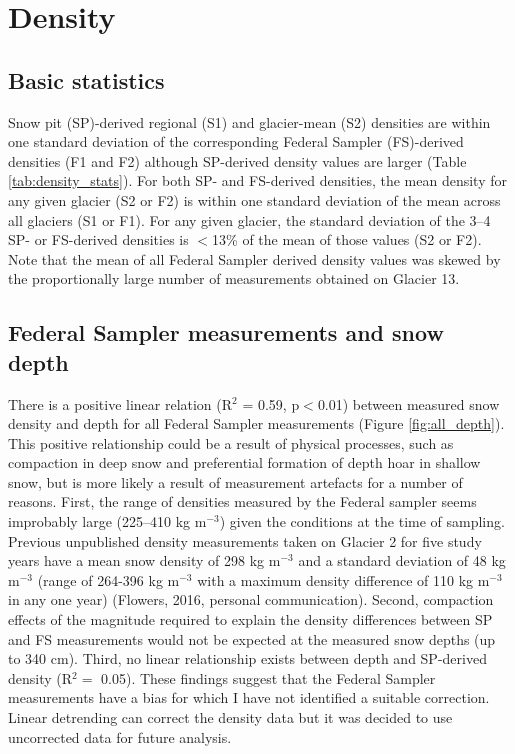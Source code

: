\documentclass{sfuthesis}
\begin{document}
\section{Density}
\label{sec:density}

\subsection{Basic statistics}

Snow pit (SP)-derived regional (S1) and glacier-mean (S2) densities are within one standard deviation of the corresponding Federal Sampler (FS)-derived densities (F1 and F2) although SP-derived density values are larger (Table \ref{tab:density_stats}). For both SP- and FS-derived densities, the mean density for any given glacier (S2 or F2) is within one standard deviation of the mean across all glaciers (S1 or F1). For any given glacier, the standard deviation of the 3--4 SP- or FS-derived densities is $<$13\% of the mean of those values (S2 or F2). Note that the mean of all Federal Sampler derived density values was skewed by the proportionally large number of measurements obtained on Glacier 13.

\subsection{Federal Sampler measurements and snow depth}
\label{sec:FSdensity&depth}

There is a positive linear relation (R$^2$ = 0.59, p$<$0.01) between measured snow density and depth for all Federal Sampler measurements (Figure \ref{fig:all_depth}). This positive relationship could be a result of physical processes, such as compaction in deep snow and preferential formation of depth hoar in shallow snow, but is more likely a result of measurement artefacts for a number of reasons. First, the range of densities measured by the Federal sampler seems improbably large (225--410 kg m$^{-3}$) given the conditions at the time of sampling. Previous unpublished density measurements taken on Glacier 2 for five study years have a mean snow density of 298 kg m$^{-3}$ and a standard deviation of 48 kg m$^{-3}$ (range of 264-396 kg m$^{-3}$ with a maximum density difference of 110 kg m$^{-3}$ in any one year) (Flowers, 2016, personal communication). Second, compaction effects of the magnitude required to explain the density differences between SP and FS measurements would not be expected at the measured snow depths (up to 340 cm). Third, no linear relationship exists between depth and SP-derived density (R$^2 =$ 0.05). These findings suggest that the Federal Sampler measurements have a bias for which I have not identified a suitable correction. Linear detrending can correct the density data but it was decided to use uncorrected data for future analysis.
\end{document}
